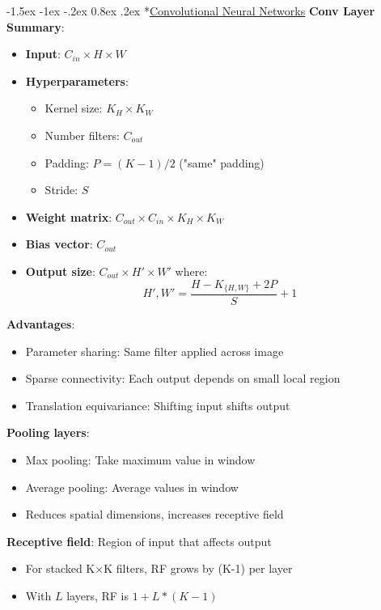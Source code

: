 \documentclass{article}
\makeatletter
\renewcommand\section{\@startsection{section}{1}{\z@}%
                                  {-1.5ex \@plus -1ex \@minus -.2ex}%
                                  {0.8ex \@plus.2ex}%
                                  {\normalfont\small\bfseries}}
\makeatother
\begin{document}
\begin{multicols}{3}
\section*{\underline{Convolutional Neural Networks}}
\textbf{Conv Layer Summary}:
\begin{itemize}
\item \textbf{Input}: $C_{in} \times H \times W$
\item \textbf{Hyperparameters}:
\begin{itemize}
\item Kernel size: $K_H \times K_W$
\item Number filters: $C_{out}$
\item Padding: $P = (K-1)/2$ ("same" padding)
\item Stride: $S$
\end{itemize}
\item \textbf{Weight matrix}: $C_{out} \times C_{in} \times K_H \times K_W$
\item \textbf{Bias vector}: $C_{out}$
\item \textbf{Output size}: $C_{out} \times H' \times W'$ where:
$$
H', W' = \frac{H - K_{\{H, W\}} + 2P}{S} + 1
$$
\end{itemize}

\textbf{Advantages}:
\begin{itemize}
\item Parameter sharing: Same filter applied across image
\item Sparse connectivity: Each output depends on small local region
\item Translation equivariance: Shifting input shifts output
\end{itemize}

\textbf{Pooling layers}: 
\begin{itemize}
\item Max pooling: Take maximum value in window
\item Average pooling: Average values in window
\item Reduces spatial dimensions, increases receptive field
\end{itemize}

\textbf{Receptive field}: Region of input that affects output
\begin{itemize}
\item For stacked K×K filters, RF grows by (K-1) per layer
\item With $L$ layers, RF is $1 + L * (K - 1)$
\end{itemize}


\end{multicols}
\end{document}
